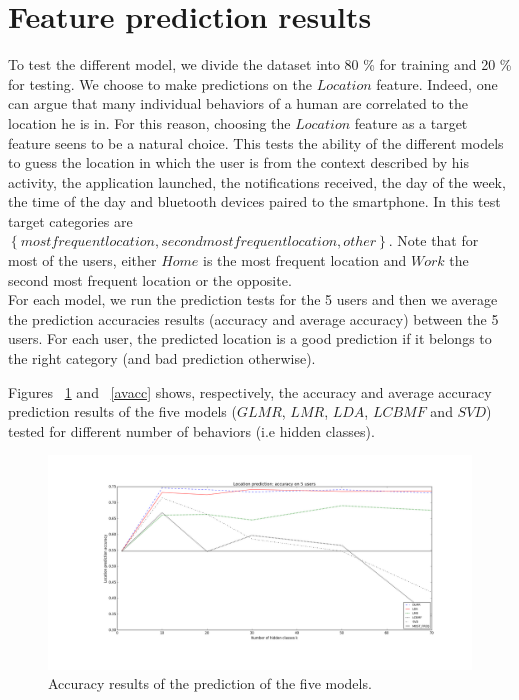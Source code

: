 \section{Feature prediction results}
To test the different model, we divide the dataset into 80 \% for training and 20 \% for testing. We choose to make predictions on the $Location$ feature. Indeed, one can argue that many individual behaviors of a human are correlated to the location he is in. For this reason, choosing the $Location$ feature as a target feature seens to be a natural choice. This tests the ability of the different models to guess the location in which the user is from the context described by his activity, the application launched, the notifications received, the day of the week, the time of the day and bluetooth devices paired to the smartphone. In this test target categories are $\left \{  most frequent location, second most frequent location, other\right \}$. 
Note that for most of the users, either $Home$ is the most frequent location and $Work$ the second most frequent location or the opposite.
\\For each model, we run the prediction tests for the 5 users and then we average the prediction accuracies results (accuracy and average accuracy) between the 5 users. For each user, the predicted location is a good prediction if it belongs to the right category (and bad prediction otherwise).

Figures ~\ref{acc} and ~\ref{avacc} shows, respectively, the accuracy and average accuracy prediction results of the five models ($GLMR$, $LMR$, $LDA$, $LCBMF$ and $SVD$) tested for different number of behaviors (i.e hidden classes).

\begin{figure} [!ht]
\centering
\includegraphics[scale=0.3]{Figures/location_accuracy.png}
\caption{Accuracy results of the prediction of the five models.}
\label{acc}
\end{figure}

